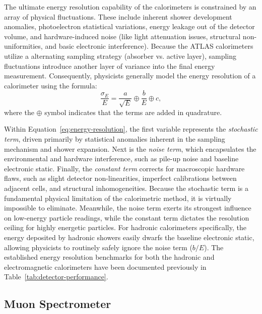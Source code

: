 The ultimate energy resolution capability of the calorimeters is constrained by an array of physical fluctuations. These include inherent shower development anomalies, photoelectron statistical variations, energy leakage out of the detector volume, and hardware-induced noise (like light attenuation issues, structural non-uniformities, and basic electronic interference).
%
Because the ATLAS calorimeters utilize a alternating sampling strategy (absorber vs. active layer), sampling fluctuations introduce another layer of variance into the final energy measurement.
%
Consequently, physicists generally model the energy resolution of a calorimeter using the formula:
\begin{equation}\label{eq:energy-resolution}
    \frac{\sigma_E}{E} = \frac{a}{\sqrt{E}} \oplus \frac{b}{E} \oplus c ,
\end{equation}
where the $\oplus$ symbol indicates that the terms are added in quadrature.

Within Equation~\eqref{eq:energy-resolution}, the first variable represents the \textit{stochastic term}, driven primarily by statistical anomalies inherent in the sampling mechanism and shower expansion. Next is the \textit{noise term}, which encapsulates the environmental and hardware interference, such as pile-up noise and baseline electronic static. Finally, the \textit{constant term} corrects for macroscopic hardware flaws, such as slight detector non-linearities, imperfect calibrations between adjacent cells, and structural inhomogeneities.
%
Because the stochastic term is a fundamental physical limitation of the calorimetric method, it is virtually impossible to eliminate. Meanwhile, the noise term exerts its strongest influence on low-energy particle readings, while the constant term dictates the resolution ceiling for highly energetic particles.
%
For hadronic calorimeters specifically, the energy deposited by hadronic showers easily dwarfs the baseline electronic static, allowing physicists to routinely safely ignore the noise term ($b/E$).
%
The established energy resolution benchmarks for both the hadronic and electromagnetic calorimeters have been documented previously in Table~\ref{tab:detector-performance}.

\subsection{Muon Spectrometer}
\label{chap:MS}

